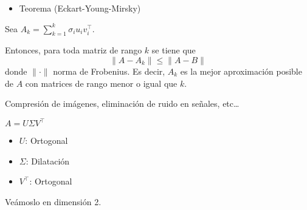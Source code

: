 \begin{itemize}[label=\color{red}\textbullet, leftmargin=*]
	\item \color{lightblue}Teorema (Eckart-Young-Mirsky)
\end{itemize}
Sea $A_k=\sum_{k=1}^{k}\sigma_iu_iv_i^\intercal$.

Entonces, para toda matriz de rango $k$ se tiene que \[ \|A-A_k\|\le\|A-B\| \]donde $\|\cdot\|$ norma de Frobenius. Es decir, $A_k$ es la mejor aproximación posible de $A$ con matrices de rango menor o igual que $k$.

 Compresión de imágenes, eliminación de ruido en señales, etc\dots

 $A=U\Sigma V^\intercal$
\begin{itemize}[label=\color{lightblue}$-$]
	\item $U$: Ortogonal
	\item $\Sigma$: Dilatación
	\item $V^\intercal$: Ortogonal
\end{itemize}
Veámoslo en dimensión 2.

\begin{center}
\end{center}

